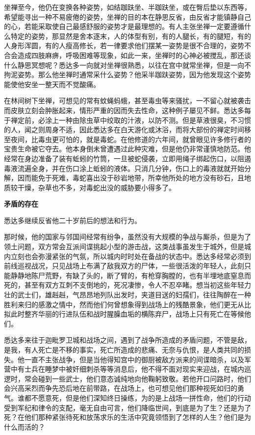 \documentclass[twoside,openany]{book}
\newcommand{\mt}[1]{\textbullet \textbf{#1}}
\begin{document}
坐禅至今，他仍在变换各种姿势，如结跏趺坐、半跏趺坐，或在臀后垫以东西等，希望能寻出一种不易疲倦的姿势，坐禅的目的本在静思反省，由反省才能镇静自己的心，若能采取使自己最感舒服的姿势才是最理想的。有人主张坐禅一定要遵循什么特定的姿势，那显然是舍本逐末，人的体型有别，有的人腿长，有的腿短，有的人身形浑圆，有的人瘦高修长，若一律要求他们摆某一姿势是很不合理的，姿势不合会造成四肢麻痹，呼吸困难等现象，如此一来，坐禅时的心神必被搅乱，那还谈什么静思冥想呢？悉达多一向就对坐禅很熟悉，以往在宫中就常坐禅，但是一向不拘泥姿势。那么他坐禅时通常采什么姿势？他采半跏趺姿势，因为他发现这个姿势能使他安坐一整天而不觉酸痛。

在林间树下坐禅，可想见的常有蚊蝇蚂蛾，甚至毒虫等来骚扰，一不留心就被袭击而皮肤立刻会肿胀起来，情形严重的因而失去性命，这种例子屡见不鲜。悉达多每于禅定前，必涂上一种由除虫草中绞取的汁液，以防不测。但是草液很臭，不习惯的人，闻之则周身不适，因此悉达多在白天游化或沐浴，而将大部份的禅定时间移至夜间，比毒虫更可怕的，就是毒蛇。在他修道的六年间，就曾眼见许多修行者的宝贵生命被它夺去。他本身倒未曾遭遇过此种灾难，但是他仍非常谨慎地防范。他经常在身边准备了装有蚯蚓的竹筒，一旦被蛇侵袭，立即用绳子绑起伤口，以阻遏毒液流遍全身，并在伤口涂上蚯蚓的液体。只消几分钟，伤口上的毒液就就开始分解，因而能免于死难，毒蛇喜出没于砂岩地带，所幸他所处的地方没有砂石，且地质较干燥，杂草也不多，对毒蛇出没的威胁要小得多了。

\mt{矛盾的存在}

悉达多继续反省他二十岁前后的想法和行为。

那时候，他的国家与邻国间经常有纷争，虽然没有大规模的争战与厮杀，但是为了领土问题，双方常会互派间谍挑起小型的游击战，这类战事虽发生于城外，但是城内立刻也会弥漫紧张的气氛，所以城内时时处在备战的状态中。悉达多经常必须到前线巡视战况，只见战场上布满了敌我双方的尸体，一些很活泼的年轻人，此刻只能静静地陈尸荒野，有缺了头的，断了臂的，有枪穿胸膛的，也有半埋地底窒息而死的，甚至有双方互刺不支倒地的，死况凄惨，令人不忍卒睹。想当初这些年轻力壮的武士们，雄赳赳，气昂昂地列队出发时，夹道目送的妇孺们，往往陶醉在一种胜利来归的感激之情中，然而他们何曾想象得到战场上的残酷景象，他们更无从比拟此时整齐华丽的行进队伍和战时腥臊血垢的横陈弃尸，战场上只有死亡在等候他们。

悉达多来往于迦毗罗卫城和战场之间，遇到了战争所造成的矛盾问题，不管是敌，是我，有人死亡是不移的事实，死亡所造成的悲痛、无奈与仇恨，是人类共同的损失。他一直不主张战争，但是当他得知宫中的御厨被敌方派来的间谍暗杀，以及军营中有士兵在睡梦中被奸细刺杀等等消息后，他不得不面对现实来迎战，在城内巡逻时，常会碰到一些武士，他们意态诚纯地向他鞠躬致敬。若他开口问路时，他们会兴高采烈而争先恐后地在前带路，在战场上，也可想见他们那种视死如归的勇气。谁都不愿意死，但是他们深知终日操练，为的是上战场一拼性命，他们的行动受到军纪和律令的支配，毫无自由可言，他们降临世间，到底是为了生？还是为了死？在他们那种紧张待死和放荡求乐的生活中究竟领悟到了怎样的人生？他们是为什么而活的？
\end{document}
